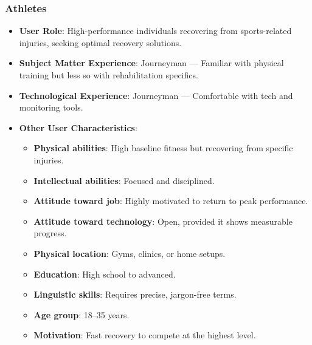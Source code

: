     \subsubsection{Athletes}
        \begin{itemize}
            \item \textbf{User Role}: High-performance individuals recovering from sports-related injuries, seeking optimal recovery solutions.
            \item \textbf{Subject Matter Experience}: Journeyman --- Familiar with physical training but less so with rehabilitation specifics.
            \item \textbf{Technological Experience}: Journeyman --- Comfortable with tech and monitoring tools.
            \item \textbf{Other User Characteristics}:
            \begin{itemize}
                \item \textbf{Physical abilities}: High baseline fitness but recovering from specific injuries.
                \item \textbf{Intellectual abilities}: Focused and disciplined.
                \item \textbf{Attitude toward job}: Highly motivated to return to peak performance.
                \item \textbf{Attitude toward technology}: Open, provided it shows measurable progress.
                \item \textbf{Physical location}: Gyms, clinics, or home setups.
                \item \textbf{Education}: High school to advanced.
                \item \textbf{Linguistic skills}: Requires precise, jargon-free terms.
                \item \textbf{Age group}: 18--35 years.
                \item \textbf{Motivation}: Fast recovery to compete at the highest level.
            \end{itemize}
        \end{itemize}

